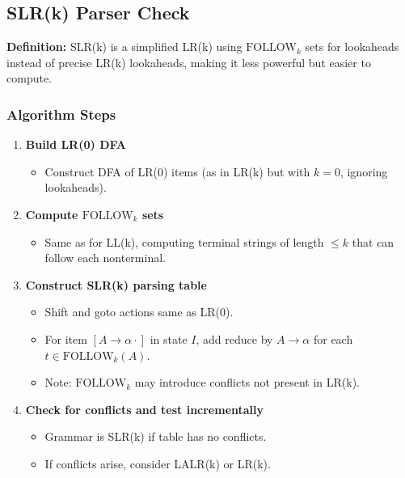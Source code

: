\subsection{SLR(k) Parser Check}

\textbf{Definition:} SLR(k) is a simplified LR(k) using \(\text{FOLLOW}_k\) sets for lookaheads instead of precise LR(k) lookaheads, making it less powerful but easier to compute.

\subsubsection{Algorithm Steps}

\begin{enumerate}
    \item \textbf{Build LR(0) DFA}
    \begin{itemize}
        \item Construct DFA of LR(0) items (as in LR(k) but with \( k = 0 \), ignoring lookaheads).
    \end{itemize}

    \item \textbf{Compute \(\text{FOLLOW}_k\) sets}
    \begin{itemize}
        \item Same as for LL(k), computing terminal strings of length \( \leq k \) that can follow each nonterminal.
    \end{itemize}

    \item \textbf{Construct SLR(k) parsing table}
    \begin{itemize}
        \item Shift and goto actions same as LR(0).
        \item For item \( [A \to \alpha \cdot] \) in state \( I \), add reduce by \( A \to \alpha \) for each \( t \in \text{FOLLOW}_k(A) \).
        \item Note: \(\text{FOLLOW}_k\) may introduce conflicts not present in LR(k).
    \end{itemize}

    \item \textbf{Check for conflicts and test incrementally}
    \begin{itemize}
        \item Grammar is SLR(k) if table has no conflicts.
        \item If conflicts arise, consider LALR(k) or LR(k).
    \end{itemize}
\end{enumerate}

